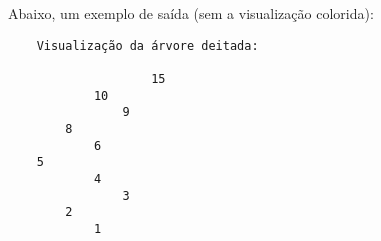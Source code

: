 \vspace{3mm}

Abaixo, um exemplo de saída (sem a visualização colorida):

\begin{lstlisting}
    Visualização da árvore deitada:

                    15
            10
                9
        8
            6
    5
            4
                3
        2
            1
\end{lstlisting}

\vspace{3}